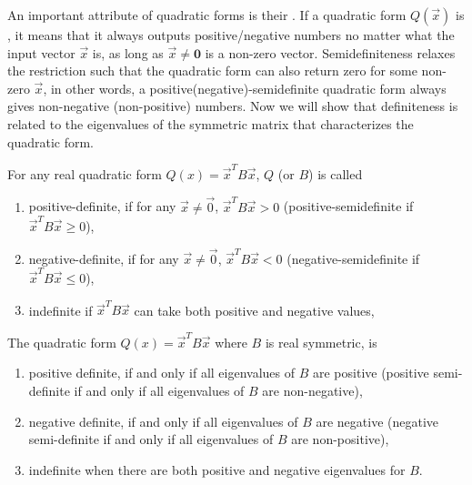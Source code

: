 An important attribute of quadratic forms is their . If a quadratic form $Q(\vec{x})$ is , it means that it always outputs positive/negative numbers no matter what the input vector $\vec{x}$ is, as long as $\vec{x} \neq \textbf{0}$ is a non-zero vector. Semidefiniteness relaxes the restriction such that the quadratic form can also return zero for some non-zero $\vec{x}$, in other words, a positive(negative)-semidefinite quadratic form always gives non-negative (non-positive) numbers. Now we will show that definiteness is related to the eigenvalues of the symmetric matrix that characterizes the quadratic form.
\begin{defn}
\label{defn:quaddefinite}
For any real quadratic form $Q(x) = \vec{x}^T B\vec{x}$, $Q$ (or $B$) is called
\begin{enumerate}[label=(\alph*)]
\item positive-definite, if for any $\vec{x} \neq \vec{0}$, $\vec{x}^T B\vec{x} > 0$ (positive-semidefinite if $\vec{x}^T B\vec{x} \geq 0$), 
\item negative-definite, if for any $\vec{x} \neq \vec{0}$, $\vec{x}^T B\vec{x} < 0$ (negative-semidefinite if $\vec{x}^T B\vec{x} \leq 0$), 
\item indefinite if $\vec{x}^T B\vec{x}$ can take both positive and negative values,
\end{enumerate}
\end{defn}
\begin{thm}
\label{thm:quaddefinite}
The quadratic form $Q(x) = \vec{x}^T B\vec{x}$ where $B$ is real symmetric, is
\begin{enumerate}[label=(\alph*)]
\item positive definite, if and only if all eigenvalues of $B$ are positive (positive semi-definite if and only if all eigenvalues of $B$ are non-negative), 
\item negative definite, if and only if all eigenvalues of $B$ are negative (negative semi-definite if and only if all eigenvalues of $B$ are non-positive), 
\item indefinite when there are both positive and negative eigenvalues for $B$.
\end{enumerate}
\end{thm}

